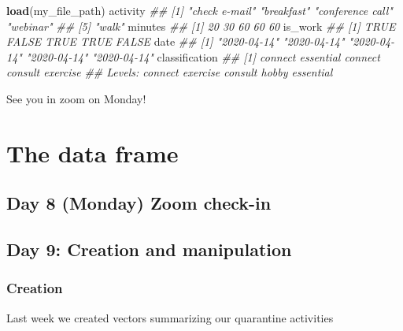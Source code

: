 \documentclass[
]{book}
\newenvironment{Shaded}{\begin{snugshade}}{\end{snugshade}}
\newcommand{\CommentTok}[1]{\textcolor[rgb]{0.56,0.35,0.01}{\textit{#1}}}
\newcommand{\KeywordTok}[1]{\textcolor[rgb]{0.13,0.29,0.53}{\textbf{#1}}}
\newcommand{\NormalTok}[1]{#1}
\begin{document}
\begin{itemize}
\begin{Shaded}
\begin{Highlighting}[]
\KeywordTok{load}\NormalTok{(my_file_path)}
\NormalTok{activity}
\CommentTok{## [1] "check e-mail"    "breakfast"       "conference call" "webinar"        }
\CommentTok{## [5] "walk"}
\NormalTok{minutes}
\CommentTok{## [1] 20 30 60 60 60}
\NormalTok{is_work}
\CommentTok{## [1]  TRUE FALSE  TRUE  TRUE FALSE}
\NormalTok{date}
\CommentTok{## [1] "2020-04-14" "2020-04-14" "2020-04-14" "2020-04-14" "2020-04-14"}
\NormalTok{classification}
\CommentTok{## [1] connect   essential connect   consult   exercise }
\CommentTok{## Levels: connect exercise consult hobby essential}
\end{Highlighting}
\end{Shaded}
\end{itemize}

See you in zoom on Monday!

\hypertarget{two}{%
\chapter{The data frame}\label{two}}

\hypertarget{day-8-monday-zoom-check-in}{%
\section{Day 8 (Monday) Zoom check-in}\label{day-8-monday-zoom-check-in}}

\hypertarget{day-9-creation-and-manipulation}{%
\section{Day 9: Creation and manipulation}\label{day-9-creation-and-manipulation}}

\hypertarget{creation}{%
\subsection*{Creation}\label{creation}}

Last week we created vectors summarizing our quarantine activities
\end{document}
